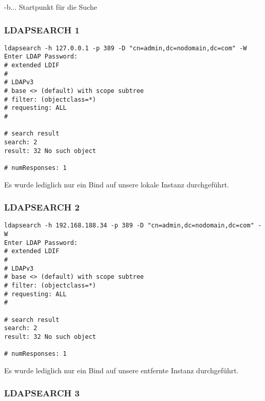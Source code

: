 -b... Startpunkt für die Suche
\cite{LdapFlags}
\newpage

\subsubsection{LDAPSEARCH 1}
\label{sec:LDAPSEARCH 1}

\begin{lstlisting}[frame=single, caption=LDAPSEARCH 1]
ldapsearch -h 127.0.0.1 -p 389 -D "cn=admin,dc=nodomain,dc=com" -W
Enter LDAP Password: 
# extended LDIF
#
# LDAPv3
# base <> (default) with scope subtree
# filter: (objectclass=*)
# requesting: ALL
#

# search result
search: 2
result: 32 No such object

# numResponses: 1
\end{lstlisting}


Es wurde lediglich nur ein Bind auf unsere lokale Instanz durchgeführt.

\subsubsection{LDAPSEARCH 2}
\label{sec:LDAPSEARCH 2}

\begin{lstlisting}[frame=single, caption=LDAPSEARCH 2]
ldapsearch -h 192.168.188.34 -p 389 -D "cn=admin,dc=nodomain,dc=com" -W
Enter LDAP Password: 
# extended LDIF
#
# LDAPv3
# base <> (default) with scope subtree
# filter: (objectclass=*)
# requesting: ALL
#

# search result
search: 2
result: 32 No such object

# numResponses: 1
\end{lstlisting}

Es wurde lediglich nur ein Bind auf unsere entfernte Instanz durchgeführt.
\newpage

\subsubsection{LDAPSEARCH 3}
\label{sec:LDAPSEARCH 3}

